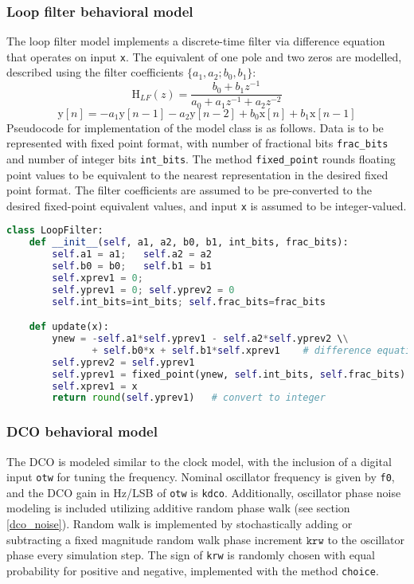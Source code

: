 \subsubsection{Loop filter behavioral model}
The loop filter model implements a discrete-time filter via difference equation that operates on input \texttt{x}. The equivalent of one pole and two zeros are modelled, described using the filter coefficients $\{a_1, a_2; b_0, b_1\}$:
\begin{equation}
\text{H}_{LF}(z) = \frac{b_0 + b_1z^{-1}}{a_0 + a_1z^{-1} + a_2z^{-2}}
\end{equation}
\begin{equation}
\text{y}[n] = -a_1 \text{y}[n-1]-a_2 \text{y}[n-2] + b_0\text{x}[n] + b_1\text{x}[n-1]
\end{equation}
Pseudocode for implementation of the model class is as follows. Data is to be represented with fixed point format, with number of fractional bits \texttt{frac\_bits} and number of integer bits \texttt{int\_bits}. The method \texttt{fixed\_point} rounds floating point values to be equivalent to the nearest representation in the desired fixed point format. The filter coefficients are assumed to be pre-converted to the desired fixed-point equivalent values, and input \texttt{x} is assumed to be integer-valued.
\begin{lstlisting}[language={Python}, caption={Loop filter behavioral model.}, label={lf_code}]
class LoopFilter:
	def __init__(self, a1, a2, b0, b1, int_bits, frac_bits):
		self.a1 = a1;	self.a2 = a2
		self.b0 = b0;	self.b1 = b1
		self.xprev1 = 0;	
		self.yprev1 = 0; self.yprev2 = 0
		self.int_bits=int_bits;	self.frac_bits=frac_bits

	def update(x):
		ynew = -self.a1*self.yprev1 - self.a2*self.yprev2 \\
			   + self.b0*x + self.b1*self.xprev1	# difference equation
		self.yprev2 = self.yprev1	
		self.yprev1 = fixed_point(ynew, self.int_bits, self.frac_bits)
		self.xprev1 = x
		return round(self.yprev1)	# convert to integer
\end{lstlisting}

\subsubsection{DCO behavioral model}
The DCO is modeled similar to the clock model, with the inclusion of a digital input \texttt{otw} for tuning the frequency. Nominal oscillator frequency is given by \texttt{f0}, and the DCO gain in Hz/LSB of \texttt{otw} is \texttt{kdco}. Additionally, oscillator phase noise modeling is included utilizing additive random phase walk (see section \ref{dco_noise}). Random walk is implemented by stochastically adding or subtracting a fixed magnitude random walk phase increment $\texttt{krw}$ to the oscillator phase every simulation step. The sign of \texttt{krw} is randomly chosen with equal probability for positive and negative, implemented with the method \texttt{choice}.


